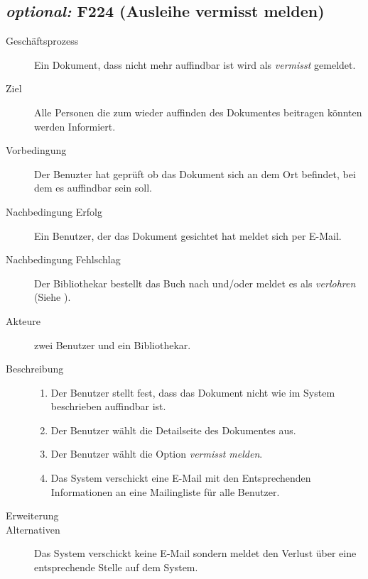 \subsection{\emph{optional:} F224 (Ausleihe vermisst melden)}
\begin{description}
  \item[Geschäftsprozess]Ein Dokument, dass nicht mehr auffindbar ist wird als \emph{vermisst} gemeldet.
  \item[Ziel]Alle Personen die zum wieder auffinden des Dokumentes beitragen könnten werden Informiert.
  \item[Vorbedingung]Der Benuzter hat geprüft ob das Dokument sich an dem Ort befindet, bei dem es auffindbar sein soll.
  \item[Nachbedingung Erfolg]Ein Benutzer, der das Dokument gesichtet hat meldet sich per E-Mail.
  \item[Nachbedingung Fehlschlag]Der Bibliothekar bestellt das Buch nach und/oder meldet es als \emph{verlohren} (Siehe ).
  \item[Akteure]zwei Benutzer und ein Bibliothekar.
  \item[Beschreibung]\hfill
    \begin{enumerate}
      \item Der Benutzer stellt fest, dass das Dokument nicht wie im System beschrieben auffindbar ist.
      \item Der Benutzer wählt die Detailseite des Dokumentes aus.
      \item Der Benutzer wählt die Option \emph{vermisst melden}.
      \item Das System verschickt eine E-Mail mit den Entsprechenden Informationen an eine Mailingliste für alle Benutzer.
    \end{enumerate}
  \item[Erweiterung]
  \item[Alternativen]Das System verschickt keine E-Mail sondern meldet den Verlust über eine entsprechende Stelle auf dem System.
\end{description}

